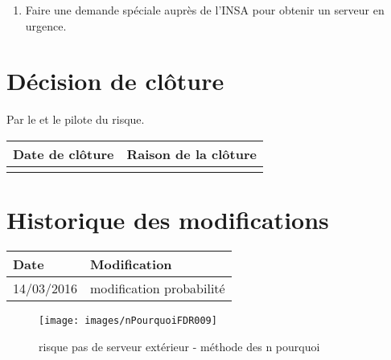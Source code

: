 \begin{enumerate}
	\item Faire une demande spéciale auprès de l'INSA pour obtenir un serveur en urgence.
\end{enumerate}

%
%
%
%

\section*{Décision de clôture}
Par le \CP{} et le pilote du risque.
\begin{table}[H]
\centering
	\begin{tabularx}{16.8cm}{|X|X|}
	\hline
	\rowcolor{gray!40} Date de clôture & Raison de la clôture \\
	\hline
	  & \\
	\hline
	\end{tabularx}
\end{table}

\section*{Historique des modifications}
\begin{table}[H]
\centering
	\begin{tabularx}{16.8cm}{|X|X|}
	\hline
	\rowcolor{gray!40} Date & Modification \\
	\hline
	 14/03/2016 & modification probabilité\\
	\hline
	\end{tabularx}
\end{table}
\newpage

\begin{figure}
	\centering
	\texttt{[image: images/nPourquoiFDR009]}
	\caption{\label{risque pas de serveur ext}risque pas de serveur extérieur - méthode des n pourquoi}
\end{figure}
